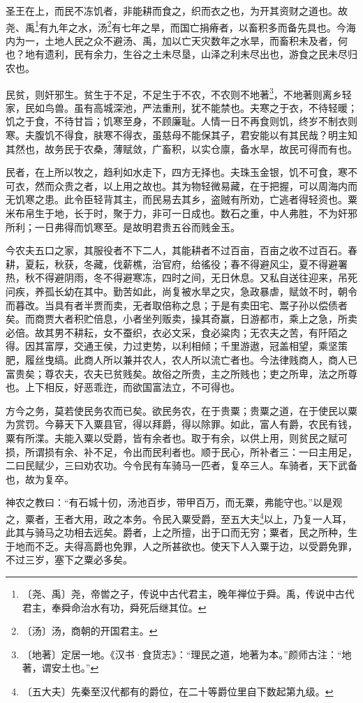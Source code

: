 \documentclass[12pt,UTF-8,openany,a4]{ctexbook}
\begin{document}
\begin{large}
    
    圣王在上，而民不冻饥者，非能耕而食之，织而衣之也，为开其资财之道也。故尧、禹\footnote{〔尧、禹〕\yiwen 尧，帝喾之子，传说中古代君主，晚年禅位于舜。禹，传说中古代君主，奉舜命治水有功，舜死后继其位。}有九年之水，汤\footnote{〔汤〕\yiwen 汤，商朝的开国君主。}有七年之旱，而国亡捐瘠者，以畜积多而备先具也。今海内为一，土地人民之众不避汤、禹，加以亡天灾数年之水旱，而畜积未及者，何也？地有遗利，民有余力，生谷之土未尽垦，山泽之利未尽出也，游食之民未尽归农也。
    
    民贫，则奸邪生。贫生于不足，不足生于不农，不农则不地著\footnote{〔地著〕\yiwen 定居一地。《汉书·食货志》：“理民之道，地著为本。”颜师古注：“地著，谓安土也。”}，不地著则离乡轻家，民如鸟兽。虽有高城深池，严法重刑，犹不能禁也。夫寒之于衣，不待轻暖；饥之于食，不待甘旨；饥寒至身，不顾廉耻。人情一日不再食则饥，终岁不制衣则寒。夫腹饥不得食，肤寒不得衣，虽慈母不能保其子，君安能以有其民哉？明主知其然也，故务民于农桑，薄赋敛，广畜积，以实仓廪，备水旱，故民可得而有也。
    
    民者，在上所以牧之，趋利如水走下，四方无择也。夫珠玉金银，饥不可食，寒不可衣，然而众贵之者，以上用之故也。其为物轻微易藏，在于把握，可以周海内而无饥寒之患。此令臣轻背其主，而民易去其乡，盗贼有所劝，亡逃者得轻资也。粟米布帛生于地，长于时，聚于力，非可一日成也。数石之重，中人弗胜，不为奸邪所利；一日弗得而饥寒至。是故明君贵五谷而贱金玉。
    
    今农夫五口之家，其服役者不下二人，其能耕者不过百亩，百亩之收不过百石。春耕，夏耘，秋获，冬藏，伐薪樵，治官府，给徭役；春不得避风尘，夏不得避署热，秋不得避阴雨，冬不得避寒冻，四时之间，无日休息。又私自送往迎来，吊死问疾，养孤长幼在其中。勤苦如此，尚复被水旱之灾，急政暴虐，赋敛不时，朝令而暮改。当具有者半贾而卖，无者取倍称之息；于是有卖田宅、鬻子孙以偿债者矣。而商贾大者积贮倍息，小者坐列贩卖，操其奇赢，日游都市，乘上之急，所卖必倍。故其男不耕耘，女不蚕织，衣必文采，食必粱肉；无农夫之苦，有阡陌之得。因其富厚，交通王侯，力过吏势，以利相倾；千里游遨，冠盖相望，乘坚策肥，履丝曳缟。此商人所以兼并农人，农人所以流亡者也。今法律贱商人，商人已富贵矣；尊农夫，农夫已贫贱矣。故俗之所贵，主之所贱也；吏之所卑，法之所尊也。上下相反，好恶乖迕，而欲国富法立，不可得也。
    
    方今之务，莫若使民务农而已矣。欲民务农，在于贵粟；贵粟之道，在于使民以粟为赏罚。今募天下入粟县官，得以拜爵，得以除罪。如此，富人有爵，农民有钱，粟有所渫。夫能入粟以受爵，皆有余者也。取于有余，以供上用，则贫民之赋可损，所谓损有余、补不足，令出而民利者也。顺于民心，所补者三：一曰主用足，二曰民赋少，三曰劝农功。今令民有车骑马一匹者，复卒三人。车骑者，天下武备也，故为复卒。
    
    神农之教曰：“有石城十仞，汤池百步，带甲百万，而无粟，弗能守也。”以是观之，粟者，王者大用，政之本务。令民入粟受爵，至五大夫\footnote{〔五大夫〕\yiwen 先秦至汉代都有的爵位，在二十等爵位里自下数起第九级。}以上，乃复一人耳，此其与骑马之功相去远矣。爵者，上之所擅，出于口而无穷；粟者，民之所种，生于地而不乏。夫得高爵也免罪，人之所甚欲也。使天下人入粟于边，以受爵免罪，不过三岁，塞下之粟必多矣。
\end{large}
\end{document}
